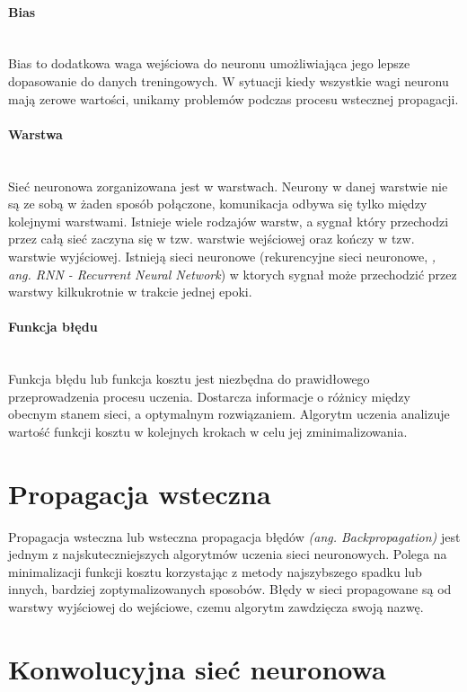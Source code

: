 \paragraph{Bias} \mbox{}\\
Bias to dodatkowa waga wejściowa do neuronu umożliwiająca jego lepsze dopasowanie
do danych treningowych. W sytuacji kiedy wszystkie wagi neuronu mają zerowe
wartości, unikamy problemów podczas procesu wstecznej propagacji.

\paragraph{Warstwa} \mbox{}\\
Sieć neuronowa zorganizowana jest w warstwach. Neurony w danej warstwie nie są
ze sobą w żaden sposób połączone, komunikacja odbywa się tylko między kolejnymi
warstwami. Istnieje wiele rodzajów warstw, a sygnał który przechodzi przez całą
sieć zaczyna się w tzw. warstwie wejściowej oraz kończy w tzw. warstwie wyjściowej.
Istnieją sieci neuronowe (rekurencyjne sieci neuronowe, \textit{, ang. RNN - Recurrent Neural Network})
w ktorych sygnał może przechodzić przez warstwy kilkukrotnie w trakcie jednej epoki.

\paragraph{Funkcja błędu} \mbox{}\\
Funkcja błędu lub funkcja kosztu jest niezbędna do prawidłowego przeprowadzenia
procesu uczenia. Dostarcza informacje o różnicy między obecnym stanem sieci, a
optymalnym rozwiązaniem. Algorytm uczenia analizuje wartość funkcji kosztu
w kolejnych krokach w celu jej zminimalizowania.

\section{Propagacja wsteczna}
Propagacja wsteczna lub wsteczna propagacja błędów \textit{(ang. Backpropagation)}
jest jednym z najskuteczniejszych algorytmów uczenia sieci neuronowych. Polega
na minimalizacji funkcji kosztu korzystając z metody najszybszego spadku lub
innych, bardziej zoptymalizowanych sposobów. Błędy w sieci propagowane są od warstwy wyjściowej
do wejściowe, czemu algorytm zawdzięcza swoją nazwę.

\section{Konwolucyjna sieć neuronowa}
